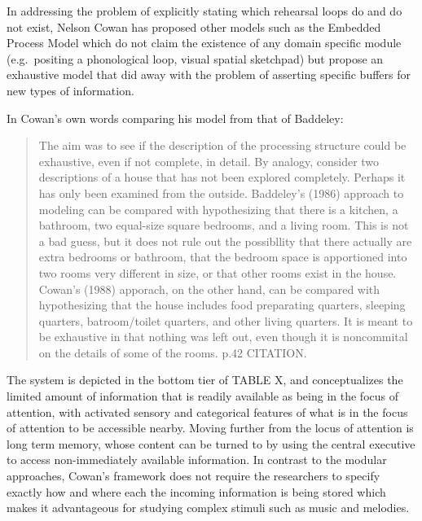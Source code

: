 \documentclass[]{book}
\theoremstyle{definition}
\theoremstyle{definition}
\theoremstyle{definition}
\theoremstyle{remark}
\begin{document}
In addressing the problem of explicitly stating which rehearsal loops do
and do not exist, Nelson Cowan has proposed other models
\citep{cowanEvolvingConceptionsMemory1988, cowanWorkingMemoryCapacity2005}
such as the Embedded Process Model which do not claim the existence of
any domain specific module (e.g.~positing a phonological loop, visual
spatial sketchpad) but propose an exhaustive model that did away with
the problem of asserting specific buffers for new types of information.

In Cowan's own words comparing his model from that of Baddeley:

\begin{quote}
The aim was to see if the description of the processing structure could
be exhaustive, even if not complete, in detail. By analogy, consider two
descriptions of a house that has not been explored completely. Perhaps
it has only been examined from the outside. Baddeley's (1986) approach
to modeling can be compared with hypothesizing that there is a kitchen,
a bathroom, two equal-size square bedrooms, and a living room. This is
not a bad guess, but it does not rule out the possibllity that there
actually are extra bedrooms or bathroom, that the bedroom space is
apportioned into two rooms very different in size, or that other rooms
exist in the house. Cowan's (1988) apporach, on the other hand, can be
compared with hypothesizing that the house includes food preparating
quarters, sleeping quarters, batroom/toilet quarters, and other living
quarters. It is meant to be exhaustive in that nothing was left out,
even though it is noncommital on the details of some of the rooms. p.42
CITATION.
\end{quote}

The system is depicted in the bottom tier of TABLE X, and conceptualizes
the limited amount of information that is readily available as being in
the focus of attention, with activated sensory and categorical features
of what is in the focus of attention to be accessible nearby. Moving
further from the locus of attention is long term memory, whose content
can be turned to by using the central executive to access
non-immediately available information. In contrast to the modular
approaches, Cowan's framework does not require the researchers to
specify exactly how and where each the incoming information is being
stored which makes it advantageous for studying complex stimuli such as
music and melodies.
\end{document}
